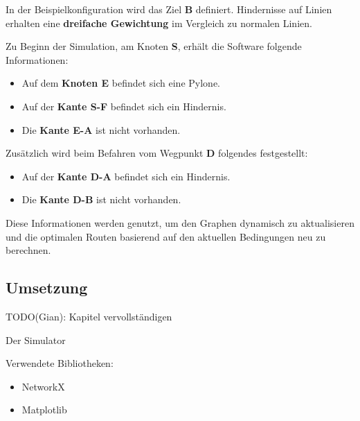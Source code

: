 \documentclass[../main.tex]{subfiles}
\begin{document}
In der Beispielkonfiguration wird das Ziel \textbf{B} definiert. Hindernisse auf Linien erhalten eine \textbf{dreifache Gewichtung} im Vergleich zu normalen Linien. 

Zu Beginn der Simulation, am Knoten \textbf{S}, erhält die Software folgende Informationen:
\begin{itemize}
    \item Auf dem \textbf{Knoten E} befindet sich eine Pylone.
    \item Auf der \textbf{Kante S-F} befindet sich ein Hindernis.
    \item Die \textbf{Kante E-A} ist nicht vorhanden.
\end{itemize}

Zusätzlich wird beim Befahren vom Wegpunkt \textbf{D} folgendes festgestellt:
\begin{itemize}
    \item Auf der \textbf{Kante D-A} befindet sich ein Hindernis.
    \item Die \textbf{Kante D-B} ist nicht vorhanden.
\end{itemize}

Diese Informationen werden genutzt, um den Graphen dynamisch zu aktualisieren und die optimalen Routen basierend auf den aktuellen Bedingungen neu zu berechnen.


\subsection{Umsetzung}

TODO(Gian): Kapitel vervollständigen

Der Simulator 


Verwendete Bibliotheken:

\begin{itemize}
    \item NetworkX
    \item Matplotlib
\end{itemize}
\end{document}
